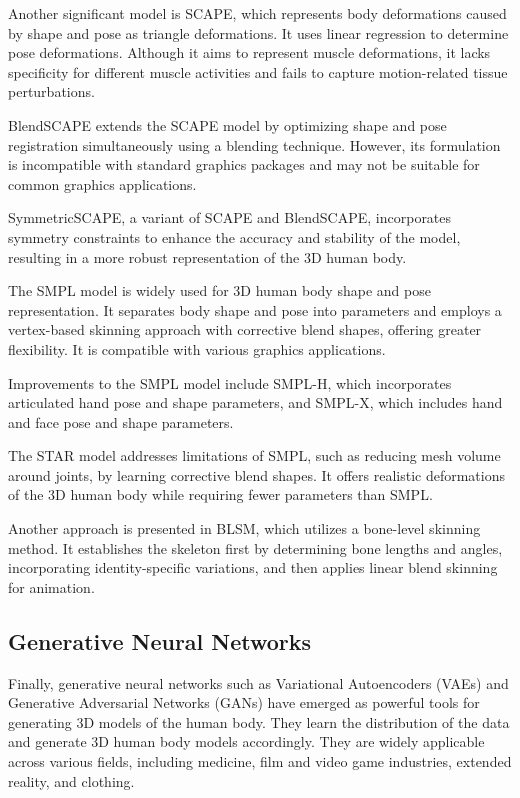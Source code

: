 Another significant model is SCAPE, which represents body deformations caused
by shape and pose as triangle deformations. It uses linear regression to
determine pose deformations. Although it aims to represent muscle deformations,
it lacks specificity for different muscle activities and fails to capture
motion-related tissue perturbations.

BlendSCAPE extends the SCAPE model by optimizing shape and pose registration
simultaneously using a blending technique. However, its formulation is
incompatible with standard graphics packages and may not be suitable for common
graphics applications.

SymmetricSCAPE, a variant of SCAPE and BlendSCAPE, incorporates symmetry
constraints to enhance the accuracy and stability of the model, resulting in a
more robust representation of the 3D human body.

The SMPL model is widely used for 3D human body shape and pose representation.
It separates body shape and pose into parameters and employs a vertex-based
skinning approach with corrective blend shapes, offering greater flexibility.
It is compatible with various graphics applications.

Improvements to the SMPL model include SMPL-H, which incorporates articulated
hand pose and shape parameters, and SMPL-X, which includes hand and face pose
and shape parameters.

The STAR model addresses limitations of SMPL, such as reducing mesh volume
around joints, by learning corrective blend shapes. It offers realistic
deformations of the 3D human body while requiring fewer parameters than SMPL.

Another approach is presented in BLSM, which utilizes a bone-level skinning
method. It establishes the skeleton first by determining bone lengths and
angles, incorporating identity-specific variations, and then applies linear
blend skinning for animation.


\subsection{Generative Neural Networks}

Finally, generative neural networks such as Variational Autoencoders (VAEs) and
Generative Adversarial Networks (GANs) have emerged as powerful tools for
generating 3D models of the human body. They learn the distribution of the data
and generate 3D human body models accordingly. They are widely applicable
across various fields, including medicine, film and video game industries,
extended reality, and clothing.

